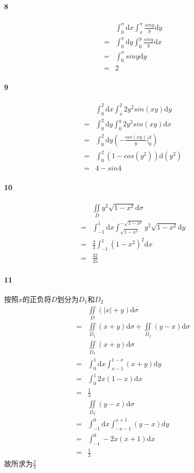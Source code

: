 \documentclass[UTF8]{ctexart}
\begin{document}
\paragraph*{8}
\begin{align*}
    &\int_{0}^{\pi} \mathrm{d}x \int_{x}^{\pi} \frac{siny}{y} \mathrm{d}y \\
    = &\int_{0}^{\pi} \mathrm{d}y \int_{0}^{y} \frac{siny}{y} \mathrm{d}x \\
    = &\int_{0}^{\pi} siny \mathrm{d}y \\
    = &2
\end{align*}
\paragraph*{9}
\begin{align*}
    &\int_{0}^{2} \mathrm{d}x \int_{x}^{2} 2y^2sin(xy)\mathrm{d}y \\
    = &\int_{0}^{2} \mathrm{d}y \int_{0}^{y} 2y^2sin(xy)\mathrm{d}x \\
    =& \int_{0}^{2} \mathrm{d}y (-\frac{cos(xy)}{y} \big|_{0}^{y}) \\
    =& \int_{0}^{2} (1-cos(y^2))\mathrm{d}(y^2) \\
    =&4-sin4
\end{align*}
\paragraph*{10}
\begin{align*}
    & \iint \limits_D y^2 \sqrt{1-x^2} \mathrm{d}\sigma \\
    =& \int_{-1}^{1} \mathrm{d}x \int_{\sqrt{1-x^2}}^{-\sqrt{1-x^2} } y^2 \sqrt{1-x^2} \mathrm{d}y \\
    =&  \frac{2}{3} \int_{-1}^{1}  (1-x^2)^2 \mathrm{d}x \\
    =& \frac{32}{45} 
\end{align*}
\paragraph*{11}
按照$x$的正负将$D$划分为$D_1$和$D_2$
\begin{align*}
    & \iint \limits_D (|x| + y) \mathrm{d}\sigma \\
    =& \iint \limits_{D_1} (x+y) \mathrm{d}\sigma + \iint \limits_{D_2} (y-x) \mathrm{d}\sigma \\
    & \iint \limits_{D_1} (x+y) \mathrm{d}\sigma \\
    =& \int_{0}^{1} \mathrm{d}x\int_{x-1}^{1-x} (x+y)\mathrm{d}y \\
    =& \int_{0}^{1} 2x(1-x)\mathrm{d}x \\
    =& \frac{1}{3}  \\
    & \iint \limits_{D_2} (y-x) \mathrm{d}\sigma \\
    =& \int_{-1}^{0} \mathrm{d}x \int_{-x-1}^{x+1} (y-x)\mathrm{d}y \\
    =& \int_{-1}^{0} -2x(x+1)\mathrm{d}x \\
    =& \frac{1}{3} 
\end{align*}
故所求为$\frac{2}{3}$
\end{document}
